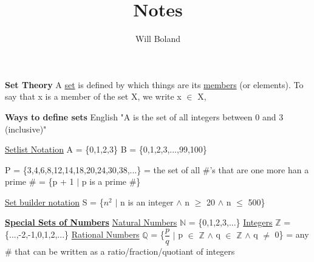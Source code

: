 \documentclass{article}
\begin{document}
\title{Notes}
\author{Will Boland}
\maketitle

\textbf{Set Theory}\newline
A \underline{set} is defined by which things are its \underline{members} (or elements).\newline
To say that x is a member of the set X, we write x $\in$ X,\newline\newline

\textbf{Ways to define sets}\newline
English \newline
"A is the set of all integers between 0 and 3 (inclusive)"\newline\newline

\underline{Setlist Notation}\newline
A = \{0,1,2,3\}\newline
B = \{0,1,2,3,...,99,100\}\newline\newline

P = \{3,4,6,8,12,14,18,20,24,30,38,...\}\newline
= the set of all \#'s that are one more han a prime \#\newline
= \{p + 1 $\mid$ p is a prime \#\}\newline\newline

\underline{Set builder notation}\newline
S = \{$n^2$ $\mid$ n is an integer $\wedge$ n $\geq$ 20 $\wedge$ n $\leq$ 500\}\newline\newline

\textbf{\underline{Special Sets of Numbers}}\newline
\underline{Natural Numbers}\newline
$\mathbb{N}$ = \{0,1,2,3,...\}\newline
\underline{Integers}\newline
$\mathbb{Z}$ = \{...,-2,-1,0,1,2,...\}\newline
\underline{Rational Numbers}\newline
$\mathbb{Q}$ = \{$\dfrac{p}{q}$ $\mid$ p $\in$ $\mathbb{Z}$ $\wedge$ q $\in$ $\mathbb{Z}$ $\wedge$ q $\neq$ 0\}\newline
= any \# that can be written as a ratio/fraction/quotiant of integers\newline\newline
\end{document}
